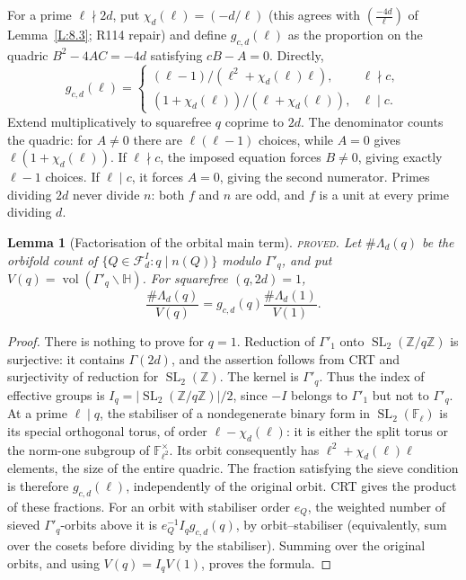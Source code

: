 \documentclass[10pt,reqno]{amsart}
\newtheorem{lemma}[theorem]{Lemma}
\theoremstyle{definition}
\numberwithin{equation}{section}
\newcommand{\Z}{\mathbb Z}
\newcommand{\HH}{\mathbb H}
\newcommand{\cF}{\mathcal F}
\DeclareMathOperator{\SL}{SL}
\DeclareMathOperator{\vol}{vol}
\newcommand{\status}[1]{\textup{\textsc{#1}}}
\begin{document}
For a prime \(\ell\nmid2d\), put \(\chi_d(\ell)=(-d/\ell)\) (this agrees
with \((\frac{-4d}{\ell})\) of Lemma~\ref{L:8.3}; R114 repair) and define
\(g_{c,d}(\ell)\) as the proportion on the quadric
\(B^2-4AC=-4d\) satisfying \(cB-A=0\). Directly,
\begin{equation}\label{B:eq:density}
 g_{c,d}(\ell)=
 \begin{cases}
 (\ell-1)/(\ell^2+\chi_d(\ell)\ell),&\ell\nmid c,\\
 (1+\chi_d(\ell))/(\ell+\chi_d(\ell)),&\ell\mid c.
 \end{cases}
\end{equation}
Extend multiplicatively to squarefree \(q\) coprime to \(2d\).
The denominator counts the quadric: for \(A\ne0\) there are
\(\ell(\ell-1)\) choices, while \(A=0\) gives
\(\ell(1+\chi_d(\ell))\). If \(\ell\nmid c\), the imposed equation
forces \(B\ne0\), giving exactly \(\ell-1\) choices. If \(\ell\mid c\),
it forces \(A=0\), giving the second numerator. Primes dividing \(2d\)
never divide \(n\): both \(f\) and \(n\) are odd, and \(f\) is a unit
at every prime dividing \(d\).

\begin{lemma}[Factorisation of the orbital main term]\label{L:6.1}
\status{proved}. Let \(\#\Lambda_d(q)\) be the orbifold count of
\(\{Q\in\cF_d^I:q\mid n(Q)\}\) modulo \(\Gamma'_q\), and put
\(V(q)=\vol(\Gamma'_q\backslash\HH)\). For squarefree \((q,2d)=1\),
\[
 \frac{\#\Lambda_d(q)}{V(q)}
 =g_{c,d}(q)\frac{\#\Lambda_d(1)}{V(1)}.
\]
\end{lemma}
\begin{proof}
There is nothing to prove for \(q=1\). Reduction of \(\Gamma'_1\)
onto \(\SL_2(\Z/q\Z)\) is surjective: it contains \(\Gamma(2d)\),
and the assertion follows from CRT and surjectivity of reduction for
\(\SL_2(\Z)\). The kernel is \(\Gamma'_q\). Thus the index of effective
groups is
\(I_q=|\SL_2(\Z/q\Z)|/2\), since \(-I\) belongs to \(\Gamma'_1\)
but not to \(\Gamma'_q\).
At a prime \(\ell\mid q\), the stabiliser of a nondegenerate binary form
in \(\SL_2(\mathbb F_\ell)\) is its special orthogonal torus, of order
\(\ell-\chi_d(\ell)\): it is either the split torus or the norm-one
subgroup of \(\mathbb F_{\ell^2}^{\times}\).
Its orbit consequently has \(\ell^2+\chi_d(\ell)\ell\) elements, the
size of the entire quadric. The fraction satisfying the sieve condition
is therefore \(g_{c,d}(\ell)\), independently of the original orbit.
CRT gives the product of these fractions.
For an orbit with stabiliser order \(e_Q\), the weighted number of
sieved \(\Gamma'_q\)-orbits above it is
\(e_Q^{-1}I_qg_{c,d}(q)\), by orbit--stabiliser (equivalently, sum over
the cosets before dividing by the stabiliser). Summing over the original
orbits, and using \(V(q)=I_qV(1)\), proves the formula.
\end{proof}
\end{document}
